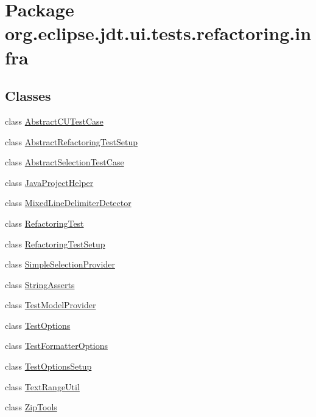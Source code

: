 \hypertarget{namespaceorg_1_1eclipse_1_1jdt_1_1ui_1_1tests_1_1refactoring_1_1infra}{
\section{Package org.eclipse.jdt.ui.tests.refactoring.infra}
\label{namespaceorg_1_1eclipse_1_1jdt_1_1ui_1_1tests_1_1refactoring_1_1infra}
}
\subsection*{Classes}
\begin{DoxyCompactItemize}
\item 
class \hyperlink{classorg_1_1eclipse_1_1jdt_1_1ui_1_1tests_1_1refactoring_1_1infra_1_1AbstractCUTestCase}{AbstractCUTestCase}
\item 
class \hyperlink{classorg_1_1eclipse_1_1jdt_1_1ui_1_1tests_1_1refactoring_1_1infra_1_1AbstractRefactoringTestSetup}{AbstractRefactoringTestSetup}
\item 
class \hyperlink{classorg_1_1eclipse_1_1jdt_1_1ui_1_1tests_1_1refactoring_1_1infra_1_1AbstractSelectionTestCase}{AbstractSelectionTestCase}
\item 
class \hyperlink{classorg_1_1eclipse_1_1jdt_1_1ui_1_1tests_1_1refactoring_1_1infra_1_1JavaProjectHelper}{JavaProjectHelper}
\item 
class \hyperlink{classorg_1_1eclipse_1_1jdt_1_1ui_1_1tests_1_1refactoring_1_1infra_1_1MixedLineDelimiterDetector}{MixedLineDelimiterDetector}
\item 
class \hyperlink{classorg_1_1eclipse_1_1jdt_1_1ui_1_1tests_1_1refactoring_1_1infra_1_1RefactoringTest}{RefactoringTest}
\item 
class \hyperlink{classorg_1_1eclipse_1_1jdt_1_1ui_1_1tests_1_1refactoring_1_1infra_1_1RefactoringTestSetup}{RefactoringTestSetup}
\item 
class \hyperlink{classorg_1_1eclipse_1_1jdt_1_1ui_1_1tests_1_1refactoring_1_1infra_1_1SimpleSelectionProvider}{SimpleSelectionProvider}
\item 
class \hyperlink{classorg_1_1eclipse_1_1jdt_1_1ui_1_1tests_1_1refactoring_1_1infra_1_1StringAsserts}{StringAsserts}
\item 
class \hyperlink{classorg_1_1eclipse_1_1jdt_1_1ui_1_1tests_1_1refactoring_1_1infra_1_1TestModelProvider}{TestModelProvider}
\item 
class \hyperlink{classorg_1_1eclipse_1_1jdt_1_1ui_1_1tests_1_1refactoring_1_1infra_1_1TestOptions}{TestOptions}
\item 
class \hyperlink{classorg_1_1eclipse_1_1jdt_1_1ui_1_1tests_1_1refactoring_1_1infra_1_1TestFormatterOptions}{TestFormatterOptions}
\item 
class \hyperlink{classorg_1_1eclipse_1_1jdt_1_1ui_1_1tests_1_1refactoring_1_1infra_1_1TestOptionsSetup}{TestOptionsSetup}
\item 
class \hyperlink{classorg_1_1eclipse_1_1jdt_1_1ui_1_1tests_1_1refactoring_1_1infra_1_1TextRangeUtil}{TextRangeUtil}
\item 
class \hyperlink{classorg_1_1eclipse_1_1jdt_1_1ui_1_1tests_1_1refactoring_1_1infra_1_1ZipTools}{ZipTools}
\end{DoxyCompactItemize}
